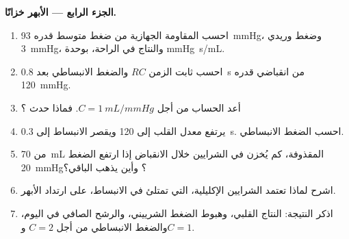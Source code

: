 \begin{problem}
\medskip
\noindent\textbf{الجزء الرابع --- الأبهر خزانًا.}
\begin{enumerate}[resume]
  \item احسب المقاومة الجهازية من ضغط متوسط قدره
        \qty{93}{mmHg}، وضغط وريدي \qty{3}{mmHg}، والنتاج في الراحة،
        بوحدة \unit{mmHg.s/mL}.
  \item احسب ثابت الزمن $RC$ والضغط الانبساطي
        بعد \qty{0.8}{s} من انقباضي قدره \qty{120}{mmHg}.
  \item أعد الحساب من أجل $C = \qty{1}{mL/mmHg}$. فماذا حدث
        ؟
  \item يرتفع معدل القلب إلى \num{120} ويقصر الانبساط إلى
        \qty{0.3}{s}. احسب الضغط الانبساطي.
  \item من \qty{70}{mL} المقذوفة، كم يُخزن في
        الشرايين خلال الانقباض إذا ارتفع الضغط
        \qty{20}{mmHg}؟ وأين يذهب الباقي؟
  \item اشرح لماذا تعتمد الشرايين الإكليلية، التي تمتلئ في الانبساط،
        على ارتداد الأبهر.
  \item اذكر النتيجة: النتاج القلبي، وهبوط الضغط
        الشرييني، والرشح الصافي في اليوم، والضغط الانبساطي
        من أجل $C = 2$ و$C = 1$.
\end{enumerate}
\end{problem}
